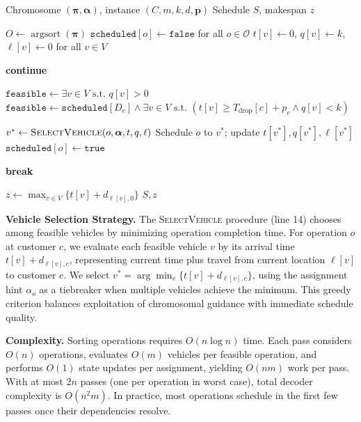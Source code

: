 \documentclass{article}
\begin{document}
\begin{algorithm}[t]
\caption{Multi-Pass Decoder}
\label{alg:decoder}
\begin{algorithmic}[1]
\Require Chromosome $(\boldsymbol{\pi}, \boldsymbol{\alpha})$, instance $(C, m, k, d, \mathbf{p})$
\Ensure Schedule $S$, makespan $z$

\State $O \gets \operatorname{argsort}(\boldsymbol{\pi})$
\State $\texttt{scheduled}[o] \gets \texttt{false}$ for all $o \in \mathcal{O}$
\State $t[v] \gets 0$, $q[v] \gets k$, $\ell[v] \gets 0$ for all $v \in V$

            \State \textbf{continue}
        \EndIf

            \State $\texttt{feasible} \gets
            \exists v \in V \text{ s.t. } q[v] > 0$
        \Else
            \State $\texttt{feasible} \gets
            \texttt{scheduled}[D_c] \land
            \exists v \in V \text{ s.t. }
            (t[v] \ge T_{\text{drop}}[c] + p_c \land q[v] < k)$
        \EndIf

            \State $v^* \gets \textsc{SelectVehicle}(o,\boldsymbol{\alpha},t,q,\ell)$
            \State Schedule $o$ to $v^*$; update $t[v^*], q[v^*], \ell[v^*]$
            \State $\texttt{scheduled}[o] \gets \texttt{true}$
        \EndIf
    \EndFor

        \State \textbf{break}
    \EndIf
\EndFor

\State $z \gets \max_{v \in V} \{ t[v] + d_{\ell[v],0} \}$
\State \Return $S, z$
\end{algorithmic}
\end{algorithm}

\textbf{Vehicle Selection Strategy.} The \textsc{SelectVehicle} procedure (line 14) chooses among feasible vehicles by minimizing operation completion time. For operation $o$ at customer $c$, we evaluate each feasible vehicle $v$ by its arrival time $t[v] + d_{\ell[v], c}$, representing current time plus travel from current location $\ell[v]$ to customer $c$. We select $v^* = \arg\min_v \{t[v] + d_{\ell[v], c}\}$, using the assignment hint $\alpha_o$ as a tiebreaker when multiple vehicles achieve the minimum. This greedy criterion balances exploitation of chromosomal guidance with immediate schedule quality.

\textbf{Complexity.} Sorting operations requires $O(n \log n)$ time. Each pass considers $O(n)$ operations, evaluates $O(m)$ vehicles per feasible operation, and performs $O(1)$ state updates per assignment, yielding $O(nm)$ work per pass. With at most $2n$ passes (one per operation in worst case), total decoder complexity is $O(n^2 m)$. In practice, most operations schedule in the first few passes once their dependencies resolve.
\end{document}

